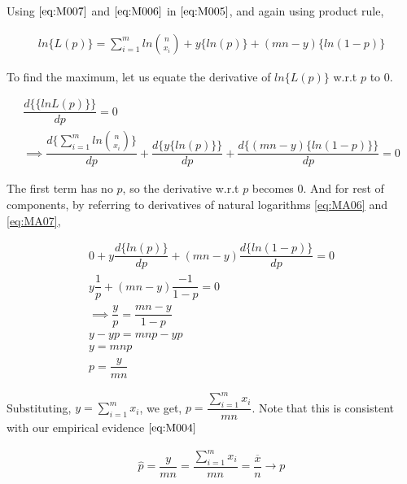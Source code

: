 \documentclass[float=false,crop=false]{standalone}
\begin{document}
    Using \(\ref{eq:M007}\) and \(\ref{eq:M006}\) in \(\ref{eq:M005}\), and
again using product rule,

\begin{equation}\begin{aligned}
    ln \Big\{ L(p) \Big\} =  \sum\limits_{i=1}^m{ln{n \choose x_i}} + y \Big\{ln(p)\Big\} + (mn-y)\Big\{ln(1-p)\Big\} \nonumber
\end{aligned}\end{equation}

    To find the maximum, let us equate the derivative of
\(ln \Big\{ L(p) \Big\}\) w.r.t \(p\) to \(0\).

\[
\begin{aligned}
    \dfrac{ d \Big\{ \{ln  L(p) \}\Big\}  }{dp} = 0 \\
    \implies \dfrac{ d\Big\{ \sum\limits_{i=1}^m{ln{n \choose x_i}} \Big\} }{dp} + 
    \dfrac{ d\Big\{ y \{ln(p)\}  \Big\} }{dp} + 
    \dfrac{ d\Big\{ (mn-y)\{ln(1-p)\} \Big\} }{dp} = 0
\end{aligned}    
\]

The first term has no \(p\), so the derivative w.r.t \(p\) becomes 0.
And for rest of components, by referring to derivatives of natural
logarithms \ref{eq:MA06} and \ref{eq:MA07},

    \[
\begin{aligned}
0 + y \dfrac{d \{ ln(p) \}}{dp} + (mn-y) \dfrac{d \{ ln(1-p) \}  }{dp} = 0 \\
y \dfrac{1}{p} + (mn-y) \dfrac{-1}{1-p} = 0 \\
\implies \dfrac{y}{p} = \dfrac{mn-y}{1-p} \\
y - yp = mnp - yp \\
y = mnp \\
p = \dfrac{y}{mn}
\end{aligned}
\]

    Substituting, \(y = \sum\limits_{i=1}^{m}x_i\), we get,
\(p = \dfrac{ \sum\limits_{i=1}^{m}x_i }{mn}\). Note that this is
consistent with our empirical evidence \(\ref{eq:M004}\)
\begin{tcolorbox}[colback=green!5,colframe=green!40!black,title=Binomial Distribution; $n$ flips; $m$ trials]
\begin{equation}
    \begin{aligned}
        \hat{p} = \dfrac{y}{mn} = \dfrac{\sum\limits_{i=1}^{m}x_i}{mn} = \dfrac{\overline{x}}{n} \to p \label{eq:M008}
    \end{aligned}
\end{equation}
\end{tcolorbox}
\end{document}
